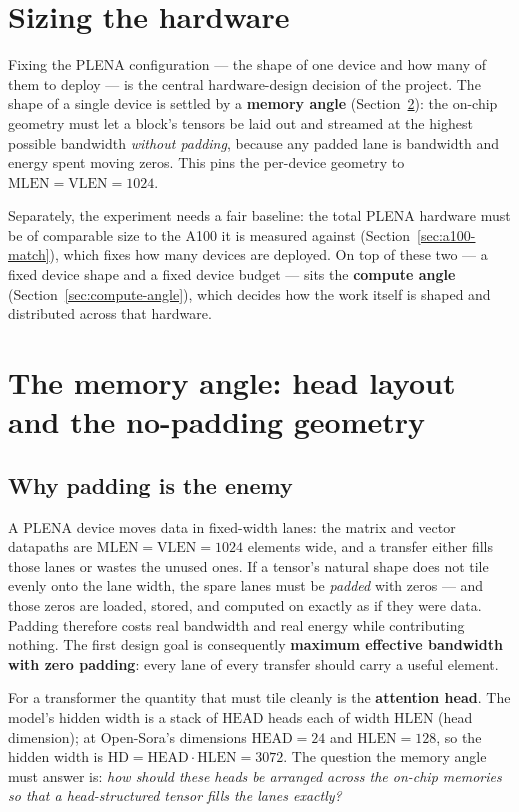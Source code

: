 \documentclass[11pt]{report}
\begin{document}
\section{Sizing the hardware}
\label{sec:hw-sizing}

Fixing the PLENA configuration --- the shape of one device and how many of
them to deploy --- is the central hardware-design decision of the project.
The shape of a single device is settled by a \textbf{memory angle}
(Section~\ref{sec:mem-angle}): the on-chip geometry must let a block's
tensors be laid out and streamed at the highest possible bandwidth
\emph{without padding}, because any padded lane is bandwidth and energy
spent moving zeros. This pins the per-device geometry to
$\text{MLEN}=\text{VLEN}=1024$.

Separately, the experiment needs a fair baseline: the total PLENA hardware
must be of comparable size to the A100 it is measured against
(Section~\ref{sec:a100-match}), which fixes how many devices are deployed.
On top of these two --- a fixed device shape and a fixed device budget ---
sits the \textbf{compute angle} (Section~\ref{sec:compute-angle}), which
decides how the work itself is shaped and distributed across that hardware.

\section{The memory angle: head layout and the no-padding geometry}
\label{sec:mem-angle}

\subsection{Why padding is the enemy}

A PLENA device moves data in fixed-width lanes: the matrix and vector
datapaths are $\text{MLEN}=\text{VLEN}=1024$ elements wide, and a transfer
either fills those lanes or wastes the unused ones. If a tensor's natural
shape does not tile evenly onto the lane width, the spare lanes must be
\emph{padded} with zeros --- and those zeros are loaded, stored, and
computed on exactly as if they were data. Padding therefore costs real
bandwidth and real energy while contributing nothing. The first design
goal is consequently \textbf{maximum effective bandwidth with zero
padding}: every lane of every transfer should carry a useful element.

For a transformer the quantity that must tile cleanly is the
\textbf{attention head}. The model's hidden width is a stack of $\text{HEAD}$
heads each of width $\text{HLEN}$ (head dimension); at Open-Sora's
dimensions $\text{HEAD}=24$ and $\text{HLEN}=128$, so the hidden width is
$\text{HD}=\text{HEAD}\cdot\text{HLEN}=3072$. The question the memory
angle must answer is: \emph{how should these heads be arranged across the
on-chip memories so that a head-structured tensor fills the lanes exactly?}
\end{document}
